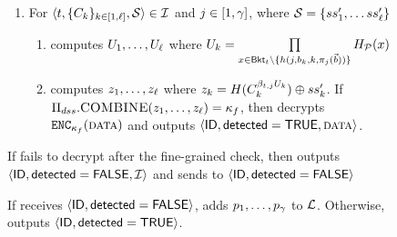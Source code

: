 \begin{figure}
{\begin{minipage}[t]{\textwidth}
\begin{enumerate}


\item \label{fuzzy:pre:fine}  For $\langle \bucketIdx, \{\contentToken{\vecIdx}\}_{\vecIdx \in [1, \genericVecLen]} ,\genericSetVar \rangle \in \bucketIDSet$ and $j \in [1, \gamma]$, where $\genericSetVar = \{ \secretShare{1}', \dots \secretShare{\genericVecLen}' \}$ 

\begin{enumerate}
\item \server computes $\accSet_1, \dots, \accSet_\genericVecLen$ where $\accSet_\vecIdx = \prod\limits_{\genericFnInput \in \bucket{\bucketIdx} \setminus \{\hashFn(\projIdx, \blocklistVec[\vecIdx], \vecIdx, \projFn[\projIdx](\blocklistVec)) \}} \primeRO(\genericSetElmt)$

\item \server computes $z_1, \dots, z_\ell$ where $z_\vecIdx = \ro(\contentToken{\vecIdx}^{\blindingFactor_{\bucketIdx, \projIdx}  \accSet_\vecIdx}) \oplus \secretShare{\vecIdx}'$. If $\Pi_{dss}.\textsc{COMBINE}(z_1, \dots, z_\ell) = \kappa_{f}$, then \server decrypts $\encrypt[\fileKey](\clientData)$ and outputs $\langle \genericFileID, \detected = \tru, \clientData \rangle$. 
\end{enumerate}
\end{enumerate}
 
\item If \server fails to decrypt after the fine-grained check, then \server outputs $\langle \mathsf{ID}, \mathsf{detected} = \mathsf{FALSE}, \mathcal{I} \rangle$ and sends to \client $\langle \mathsf{ID}, \mathsf{detected}=\mathsf{FALSE}\rangle$



\item If \client receives $\langle \mathsf{ID}, \mathsf{detected}=\mathsf{FALSE}\rangle$, \client adds $\clientVecProj[1], \dots, \clientVecProj[\numProjections]$ to $\mathcal{L}$. Otherwise, \client outputs $\langle \mathsf{ID}, \mathsf{detected}=\mathsf{TRUE} \rangle$.



\end{minipage}}
\end{figure}
